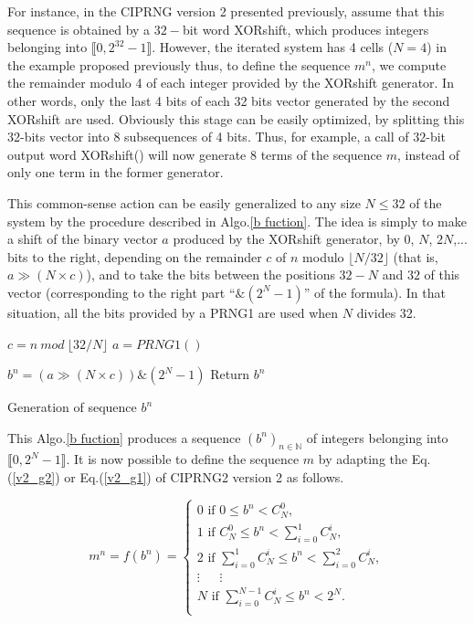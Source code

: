 For instance, in the CIPRNG version 2 presented previously, assume that this sequence is obtained by a $32-$bit word
XORshift, which produces integers belonging into $\llbracket 0, 2^{32}-1 \rrbracket$.
However, the iterated system has 4 cells ($N=4$) in the example proposed previously thus, 
to define the sequence $m^n$, we compute the remainder modulo 4 of each integer provided by the XORshift generator.
In other words, only the last 4 bits of each 32 bits vector generated by the second XORshift are used.
Obviously this stage can be easily optimized, by splitting this 32-bits vector into 8 subsequences of 4 bits.
Thus, for example, a call of $32$-bit output word XORshift() will now generate $8$ terms of the sequence $m$, instead of only one term in the former generator.

This common-sense action can be easily generalized to any size $N \leqslant 32$ of 
the system by the procedure described in Algo.\ref{b fuction}. The idea is simply 
to make a shift of the binary vector $a$ produced by the XORshift generator, by $0$, $N$, $2N$,... 
bits to the right, depending on the remainder $c$ of $n$ modulo $\lfloor N/32 \rfloor$ (that is, 
$a \gg (N \times c)$), and to take the bits between the positions $32-N$ and $32$ of this vector 
(corresponding to the right part ``$\& (2^N-1)$'' of the formula).
In that situation, all the bits provided by a PRNG1 are used when $N$ divides 32.

\begin{algorithm}
\begin{algorithmic}[1]
\STATE $c=n~mod~\lfloor32/N\rfloor$
  \STATE $a = PRNG1()$
\ENDIF

  \STATE $b^n= (a\gg (N \times c))\& (2^N-1)$
\STATE Return {$b^n$}
\medskip
\end{algorithmic}
\caption{Generation of sequence $b^n$}
\label{b fuction}
\end{algorithm}

This Algo.\ref{b fuction} produces a sequence $(b^n)_{n \in \mathds{N}}$ of integers belonging into 
$\llbracket 0, 2^N-1 \rrbracket$.
It is now possible to define the sequence $m$ by adapting the Eq.(\ref{v2_g2}) or 
Eq.(\ref{v2_g1}) of CIPRNG2 version 2 as follows.

\begin{equation}
\label{lut_m}
m^n = f(b^n)=
\left\{
\begin{array}{l}
0 \text{ if }0				\leqslant {b^n} < {C^0_N},\\
1 \text{ if }{C^0_N}	\leqslant {b^n} < \sum_{i=0}^1 {C^i_N},\\
2 \text{ if }\sum_{i=0}^1{C^i_N}	\leqslant {b^n} < \sum_{i=0}^2 {C^i_N},\\
\vdots~~~~~					~~\vdots~~~		    ~~~~\\
N \text{ if }\sum_{i=0}^{N-1} {C^i_N}	\leqslant {b^n} < 2^N.\\
\end{array}
\right.
\end{equation}

